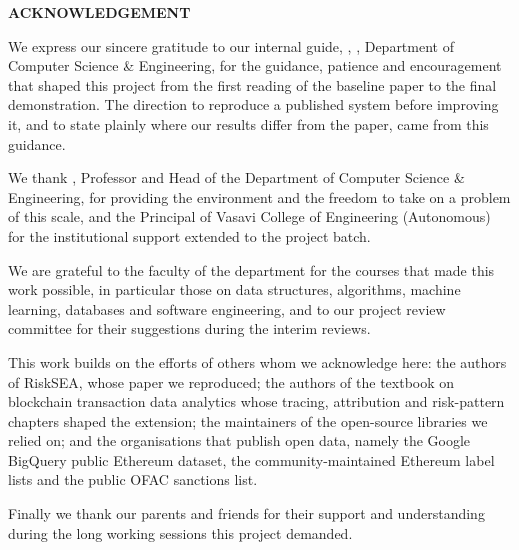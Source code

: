 \setcounter{page}{1}
\begin{center}{\bfseries\fontsize{16}{20}\selectfont ACKNOWLEDGEMENT}\end{center}
\vspace{6pt}
\noindent We express our sincere gratitude to our internal guide, \GuideName, \GuideDesignation, Department of Computer Science \& Engineering, for the guidance, patience and encouragement that shaped this project from the first reading of the baseline paper to the final demonstration. The direction to reproduce a published system before improving it, and to state plainly where our results differ from the paper, came from this guidance.

We thank \HodName, Professor and Head of the Department of Computer Science \& Engineering, for providing the environment and the freedom to take on a problem of this scale, and the Principal of Vasavi College of Engineering (Autonomous) for the institutional support extended to the project batch.

We are grateful to the faculty of the department for the courses that made this work possible, in particular those on data structures, algorithms, machine learning, databases and software engineering, and to our project review committee for their suggestions during the interim reviews.

This work builds on the efforts of others whom we acknowledge here: the authors of RiskSEA, whose paper we reproduced; the authors of the textbook on blockchain transaction data analytics whose tracing, attribution and risk-pattern chapters shaped the extension; the maintainers of the open-source libraries we relied on; and the organisations that publish open data, namely the Google BigQuery public Ethereum dataset, the community-maintained Ethereum label lists and the public OFAC sanctions list.

Finally we thank our parents and friends for their support and understanding during the long working sessions this project demanded.

\vspace{26pt}
\begin{flushright}\singlespacing
\StudentA\\\HtA\\[8pt]
\StudentB\\\HtB\\[8pt]
\StudentC\\\HtC
\end{flushright}
\clearpage


